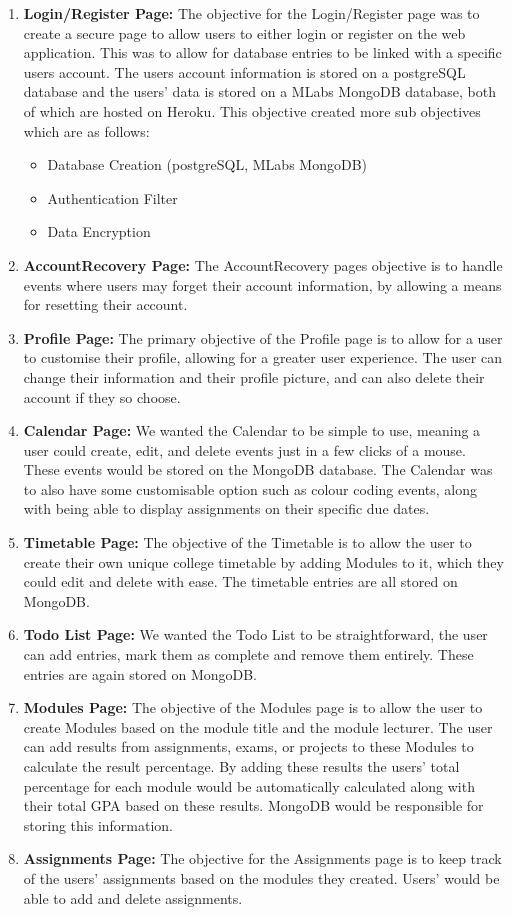 \begin{enumerate}
    \item \textbf{Login/Register Page:} The objective for the Login/Register page was to create a secure page to allow users to either login or register on the web application. This was to allow for database entries to be linked with a specific users account. The users account information is stored on a postgreSQL database and the users' data is stored on a MLabs MongoDB database, both of which are hosted on Heroku. This objective created more sub objectives which are as follows:
    \begin{itemize}
        \item Database Creation (postgreSQL, MLabs MongoDB)
        \item Authentication Filter
        \item Data Encryption
    \end{itemize}
    \item \textbf{AccountRecovery Page:} The AccountRecovery pages objective is to handle events where users may forget their account information, by allowing a means for resetting their account.
    \item \textbf{Profile Page:} The primary objective of the Profile page is to allow for a user to customise their profile, allowing for a greater user experience. The user can change their information and their profile picture, and can also delete their account if they so choose.
    \item \textbf{Calendar Page:} We wanted the Calendar to be simple to use, meaning a user could create, edit, and delete events just in a few clicks of a mouse. These events would be stored on the MongoDB database. The Calendar was to also have some customisable option such as colour coding events, along with being able to display assignments on their specific due dates.
    \item \textbf{Timetable Page:} The objective of the Timetable is to allow the user to create their own unique college timetable by adding Modules to it, which they could edit and delete with ease. The timetable entries are all stored on MongoDB.
    \item \textbf{Todo List Page:} We wanted the Todo List to be straightforward, the user can add entries, mark them as complete and remove them entirely. These entries are again stored on MongoDB.
    \item \textbf{Modules Page:} The objective of the Modules page is to allow the user to create Modules based on the module title and the module lecturer. The user can add results from assignments, exams, or projects to these Modules to calculate the result percentage. By adding these results the users’ total percentage for each module would be automatically calculated along with their total GPA based on these results. MongoDB would be responsible for storing this information.
    \item \textbf{Assignments Page:} The objective for the Assignments page is to keep track of the users' assignments based on the modules they created. Users' would be able to add and delete assignments.
\end{enumerate}

